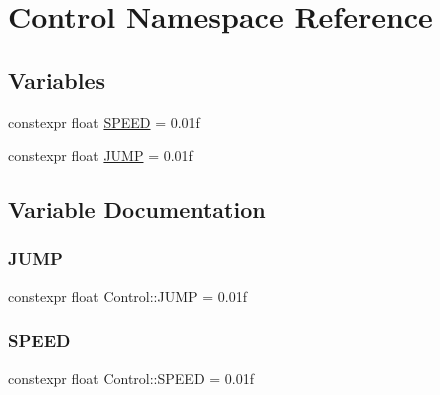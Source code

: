 \hypertarget{namespaceControl}{}\section{Control Namespace Reference}
\label{namespaceControl}
\subsection*{Variables}
\begin{DoxyCompactItemize}
\item 
constexpr float \hyperlink{namespaceControl_a56babc87b3c7df1aba525ccd3e80abf7}{S\+P\+E\+ED} = 0.\+01f
\item 
constexpr float \hyperlink{namespaceControl_a04a945fadad95f496ca4e1f3d870881a}{J\+U\+MP} = 0.\+01f
\end{DoxyCompactItemize}


\subsection{Variable Documentation}
\mbox{\label{namespaceControl_a04a945fadad95f496ca4e1f3d870881a}} 
\subsubsection{\texorpdfstring{J\+U\+MP}{JUMP}}
{\footnotesize\ttfamily constexpr float Control\+::\+J\+U\+MP = 0.\+01f}

\mbox{\label{namespaceControl_a56babc87b3c7df1aba525ccd3e80abf7}} 
\subsubsection{\texorpdfstring{S\+P\+E\+ED}{SPEED}}
{\footnotesize\ttfamily constexpr float Control\+::\+S\+P\+E\+ED = 0.\+01f}

